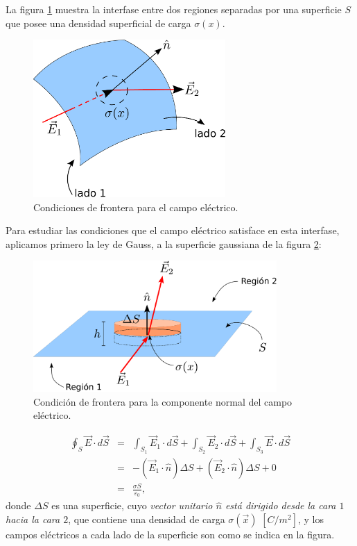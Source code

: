 La figura \ref{DSCE1} muestra la interfase entre dos regiones separadas por una
superficie $S$ que posee una densidad superficial de carga $\sigma(x)$.
\begin{figure}[!h]
\centerline{\includegraphics[height=6cm]{fig/fig-superficie-frontera.pdf}}
\caption{Condiciones de frontera para el campo eléctrico.}
\label{DSCE1}
\end{figure}
Para estudiar las condiciones que el campo eléctrico satisface en esta
interfase, aplicamos primero la ley de Gauss, a la superficie gaussiana de la
figura \ref{DSCE2}:
\begin{figure}[!h]
\centerline{\includegraphics[height=5cm]{fig/fig-condicion-borde-electrico-01.pdf}}
\caption{Condición de frontera para la componente normal del campo eléctrico.}
\label{DSCE2}
\end{figure}
\begin{eqnarray}
\oint_{S} \vec{E}\cdot d\vec{S}&=&\int_{S_1}
\vec{E}_1\cdot d\vec{S}+\int_{S_2} \vec{E}_2 \cdot d\vec{S}+\int_{S_3}
\vec{E}\cdot d\vec{S}\\
&=& -(\vec{E}_1\cdot\hat{n})\Delta S+(\vec{E}_2\cdot\hat{n})\Delta S+0\\
&=& \frac{\sigma S}{\varepsilon_0},
\end{eqnarray}
donde $\Delta S$ es una superficie, cuyo \textit{vector unitario $\hat{n}$ está dirigido
desde la cara $1$ hacia la cara $2$}, que contiene una densidad de carga
$\sigma(\vec{x})$ $\left[ C/m^2\right]  $, y los campos eléctricos a
cada lado de la superficie son como se indica en la figura.

